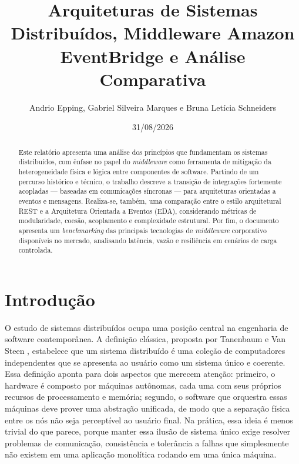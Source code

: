 \documentclass[12pt, a4paper]{article}
\title{\textbf{Arquiteturas de Sistemas Distribuídos, Middleware Amazon EventBridge e Análise Comparativa}}
\author{Andrio Epping, Gabriel Silveira Marques e Bruna Letícia Schneiders}
\date{31/08/2026}
\begin{document}
\maketitle

\begin{abstract}
Este relatório apresenta uma análise dos princípios que fundamentam os sistemas distribuídos, com ênfase no papel do \textit{middleware} como ferramenta de mitigação da heterogeneidade física e lógica entre componentes de software. Partindo de um percurso histórico e técnico, o trabalho descreve a transição de integrações fortemente acopladas --- baseadas em comunicações síncronas --- para arquiteturas orientadas a eventos e mensagens. Realiza-se, também, uma comparação entre o estilo arquitetural REST e a Arquitetura Orientada a Eventos (EDA), considerando métricas de modularidade, coesão, acoplamento e complexidade estrutural. Por fim, o documento apresenta um \textit{benchmarking} das principais tecnologias de \textit{middleware} corporativo disponíveis no mercado, analisando latência, vazão e resiliência em cenários de carga controlada.
\end{abstract}

\tableofcontents
\newpage

\section{Introdução}

O estudo de sistemas distribuídos ocupa uma posição central na engenharia de software contemporânea. A definição clássica, proposta por Tanenbaum e Van Steen \cite{tanenbaum2002}, estabelece que um sistema distribuído é uma coleção de computadores independentes que se apresenta ao usuário como um sistema único e coerente. Essa definição aponta para dois aspectos que merecem atenção: primeiro, o hardware é composto por máquinas autônomas, cada uma com seus próprios recursos de processamento e memória; segundo, o software que orquestra essas máquinas deve prover uma abstração unificada, de modo que a separação física entre os nós não seja perceptível ao usuário final. Na prática, essa ideia é menos trivial do que parece, porque manter essa ilusão de sistema único exige resolver problemas de comunicação, consistência e tolerância a falhas que simplesmente não existem em uma aplicação monolítica rodando em uma única máquina.
\end{document}
